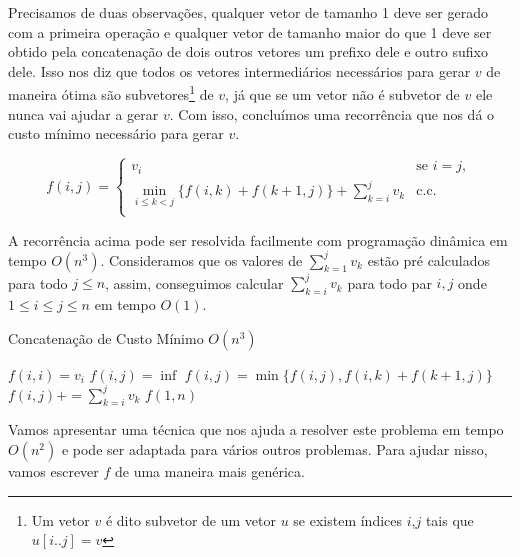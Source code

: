 Precisamos de duas observações, qualquer vetor de tamanho 1 deve ser gerado com a primeira operação e qualquer vetor de tamanho maior do que 1 deve ser obtido pela concatenação de dois outros vetores um prefixo dele e outro sufixo dele. Isso nos diz que todos os vetores intermediários necessários para gerar $v$ de maneira ótima são subvetores\footnote{Um vetor $v$ é dito subvetor de um vetor $u$ se existem índices $i$,$j$ tais que $u[i..j] = v$} de $v$, já que se um vetor não é subvetor de $v$ ele nunca vai ajudar a gerar $v$. Com isso, concluímos uma recorrência que nos dá o custo mínimo necessário para gerar $v$. 

$$
f(i,j) = \begin{cases}
    v_i & \text{se } i = j, \\
    \min\limits_{i \leq k < j} \Big\{ f(i,k) + f(k+1,j) \Big\} + \sum\limits_{k=i}^j v_k & \text{c.c.} \\
\end{cases}
$$

A recorrência acima pode ser resolvida facilmente com programação dinâmica em tempo $O(n^3)$. Consideramos que os valores de $\sum\limits_{k=1}^j v_k$ estão pré calculados para todo $j \leq n$, assim, conseguimos calcular $\sum\limits_{k=i}^j v_k$ para todo par $i,j$ onde $1 \leq i \leq j \leq n$ em tempo $O(1)$.
\begin{algorithm}[H]
\caption{Concatenação de Custo Mínimo $O(n^3)$}
\label{MinCostConcat}
\begin{algorithmic}[1]
        \State $f(i,i) = v_i$
    \EndFor
            \State $f(i,j) = \inf$
                \State $f(i,j) = \min\{f(i,j), f(i,k)+f(k+1,j)\}$
            \EndFor
            \State $f(i,j) += \sum\limits_{k=i}^j v_k$
        \EndFor
    \EndFor
    \State \Return $f(1,n)$
\EndFunction
\end{algorithmic}
\end{algorithm}

Vamos apresentar uma técnica que nos ajuda a resolver este problema em tempo $O(n^2)$ e pode ser adaptada para vários outros problemas. Para ajudar nisso, vamos escrever $f$ de uma maneira mais genérica. \\

